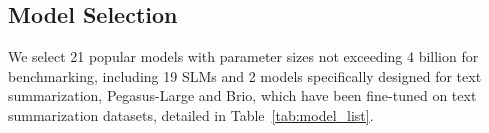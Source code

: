 \subsection{Model Selection}
We select 21 popular models with parameter sizes not exceeding 4 billion for benchmarking, including 19 SLMs and 2 models specifically designed for text summarization, Pegasus-Large and Brio, which have been fine-tuned on text summarization datasets, detailed in Table~\ref{tab:model_list}.








